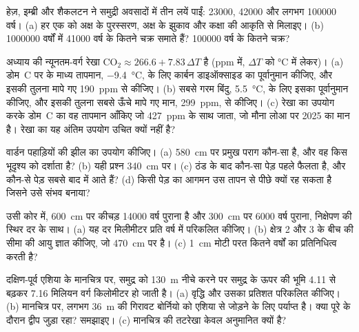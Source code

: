 \begin{exercise}[$\star$]\label{exo:g12:past-climates:5}
हेज़, इम्ब्री और शैकलटन ने समुद्री अवसादों में तीन लयें पाईं:
\num{23000}, \num{42000} और लगभग \num{100000} वर्ष। (a) हर एक को
अक्ष के पुरस्सरण, अक्ष के झुकाव और कक्षा की आकृति से मिलाइए।
(b) \num{1000000} वर्षों में \num{41000} वर्ष के कितने चक्र समाते हैं?
\num{100000} वर्ष के कितने चक्र?
\end{exercise}

\begin{exercise}[$\star\star$]\label{exo:g12:past-climates:6}
अध्याय की न्यूनतम-वर्ग रेखा $\mathrm{CO_2} \approx 266.6 +
7.83\,\Delta T$ है (ppm में, $\Delta T$ को \unit{\degreeCelsius} में लेकर)।
(a) डोम~C पर  के माध्य तापमान,
\qty{-9.4}{\degreeCelsius}, के लिए कार्बन डाइऑक्साइड का पूर्वानुमान कीजिए, और इसकी तुलना मापे गए
\qty{190}{ppm} से कीजिए। (b) सबसे गरम बिंदु, \qty{+5.5}{\degreeCelsius}, के लिए इसका पूर्वानुमान कीजिए,
और इसकी तुलना सबसे ऊँचे मापे गए मान, \qty{299}{ppm}, से कीजिए। (c) रेखा का उपयोग
करके डोम~C का वह तापमान आँकिए जो \qty{427}{ppm} के साथ जाता, जो मौना लोआ पर
2025 का मान है। रेखा का यह अंतिम उपयोग उचित क्यों नहीं है?
\end{exercise}

\begin{exercise}[$\star\star$]\label{exo:g12:past-climates:7}
वार्डन पहाड़ियों की झील का  उपयोग कीजिए। (a) \qty{580}{cm} पर प्रमुख
पराग कौन-सा है, और वह किस भूदृश्य को दर्शाता है? (b) यही
प्रश्न \qty{340}{cm} पर। (c) ठंड के बाद कौन-सा पेड़ पहले फैलता है, और
कौन-से पेड़ सबसे बाद में आते हैं? (d) किसी पेड़ का आगमन उस तापन से पीछे क्यों रह सकता है
जिसने उसे संभव बनाया?
\end{exercise}

\begin{exercise}[$\star\star$]\label{exo:g12:past-climates:8}
उसी कोर में, \qty{600}{cm} पर कीचड़ \num{14000} वर्ष पुराना है और
\qty{300}{cm} पर \num{6000} वर्ष पुराना, निक्षेपण की स्थिर दर के साथ।
(a) यह दर मिलीमीटर प्रति वर्ष में परिकलित कीजिए। (b) क्षेत्र 2 और 3 के बीच की
सीमा की आयु ज्ञात कीजिए, जो \qty{470}{cm} पर है। (c) \qty{1}{cm} मोटी परत
कितने वर्षों का प्रतिनिधित्व करती है?
\end{exercise}

\begin{exercise}[$\star\star$]\label{exo:g12:past-climates:9}
दक्षिण-पूर्व एशिया के मानचित्र पर, समुद्र को \qty{130}{m} नीचे करने पर समुद्र के ऊपर की भूमि 4.11 से
बढ़कर 7.16 मिलियन वर्ग किलोमीटर हो जाती है।
(a) वृद्धि और उसका प्रतिशत परिकलित कीजिए। (b) मानचित्र पर, लगभग
\qty{36}{m} की गिरावट बोर्नियो को एशिया से जोड़ने के लिए पर्याप्त है। क्या पूरे  के दौरान द्वीप जुड़ा रहा? समझाइए। (c) मानचित्र की तटरेखा केवल
अनुमानित क्यों है?
\end{exercise}

